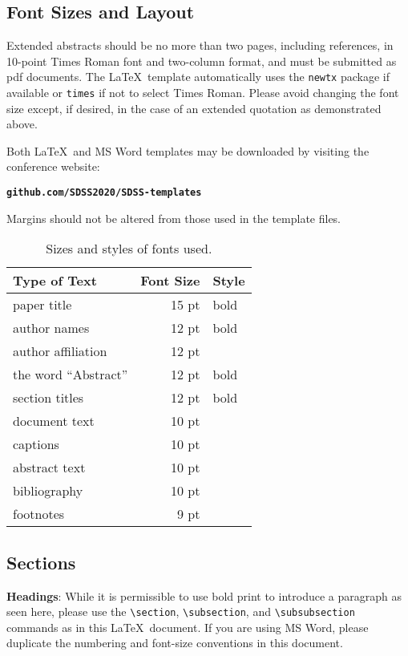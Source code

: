 \documentclass[10pt]{article}
\begin{document}
\subsection{Font Sizes and Layout}
Extended abstracts should be no more than two pages, including references,
in 10-point Times Roman font and two-column format, and must be submitted as pdf documents.
The \LaTeX\ template automatically uses the {\tt newtx} package if available
or {\tt times} if not to select Times Roman.
Please avoid changing the font size except, if desired, in the case of an extended
quotation as demonstrated above.

Both \LaTeX\ and
MS Word templates may be downloaded by visiting the conference website:
\begin{center}
\textbf{\texttt{github.com/SDSS2020/SDSS-templates}}
\end{center}
Margins should not be altered from those used in the template files.

\begin{table}[h]
\begin{center}
\begin{tabular}{|l|rl|}
\hline \bf Type of Text & \bf Font Size & \bf Style \\ \hline
paper title & 15 pt & bold \\
author names & 12 pt & bold \\
author affiliation & 12 pt & \\
the word ``Abstract'' & 12 pt & bold \\
section titles & 12 pt & bold \\
document text & 10 pt  &\\
captions & 10 pt & \\
abstract text & 10 pt & \\
bibliography & 10 pt & \\
footnotes & 9 pt & \\
\hline
\end{tabular}
\end{center}
\caption{\label{fontsizes} Sizes and styles of fonts used.}
\end{table}


\subsection{Sections}
\label{info-on-sections}

{\bf Headings}: While it is permissible to use bold print to introduce a paragraph
as seen here, please use the \verb+\section+,
\verb+\subsection+, and \verb+\subsubsection+
commands as in this \LaTeX\ document.  If you are using MS Word, please duplicate
the numbering and font-size conventions in this document.
\end{document}
